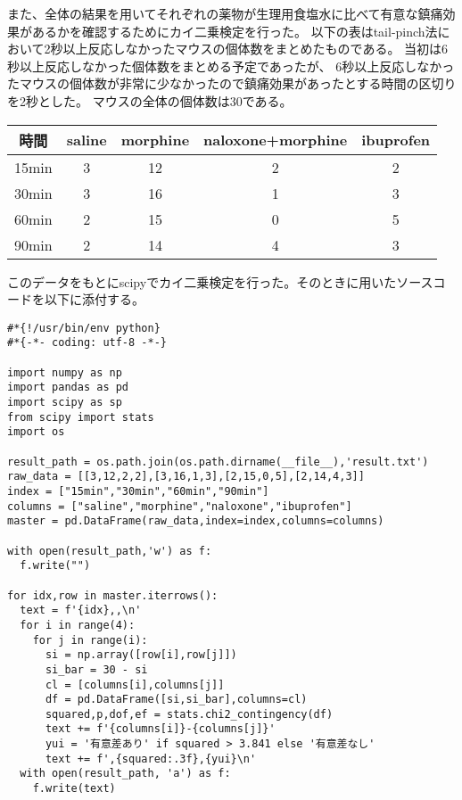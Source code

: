 \documentclass[a4paper,papersize,dvipdfmx]{jsarticle}
\begin{document}
また、全体の結果を用いてそれぞれの薬物が生理用食塩水に比べて有意な鎮痛効果があるかを確認するためにカイ二乗検定を行った。
以下の表はtail-pinch法において2秒以上反応しなかったマウスの個体数をまとめたものである。
当初は6秒以上反応しなかった個体数をまとめる予定であったが、
6秒以上反応しなかったマウスの個体数が非常に少なかったので鎮痛効果があったとする時間の区切りを2秒とした。
マウスの全体の個体数は30である。

\begin{table}[H]
\centering
\begin{tabular}{|c|c|c|c|c|}
\hline
時間    & saline & morphine & naloxone+morphine & ibuprofen \\ \hline
15min & 3      & 12       & 2                 & 2         \\ \hline
30min & 3      & 16       & 1                 & 3         \\ \hline
60min & 2      & 15       & 0                 & 5         \\ \hline
90min & 2      & 14       & 4                 & 3         \\ \hline
\end{tabular}
\end{table}

このデータをもとにscipyでカイ二乗検定を行った。そのときに用いたソースコードを以下に添付する。

\begin{lstlisting}[caption=chi\_sq.py]
#*{!/usr/bin/env python}
#*{-*- coding: utf-8 -*-}

import numpy as np
import pandas as pd
import scipy as sp
from scipy import stats
import os

result_path = os.path.join(os.path.dirname(__file__),'result.txt')
raw_data = [[3,12,2,2],[3,16,1,3],[2,15,0,5],[2,14,4,3]]
index = ["15min","30min","60min","90min"]
columns = ["saline","morphine","naloxone","ibuprofen"]
master = pd.DataFrame(raw_data,index=index,columns=columns)

with open(result_path,'w') as f:
  f.write("")

for idx,row in master.iterrows():
  text = f'{idx},,\n'
  for i in range(4):
    for j in range(i):
      si = np.array([row[i],row[j]])
      si_bar = 30 - si
      cl = [columns[i],columns[j]]
      df = pd.DataFrame([si,si_bar],columns=cl)
      squared,p,dof,ef = stats.chi2_contingency(df)
      text += f'{columns[i]}-{columns[j]}'
      yui = '有意差あり' if squared > 3.841 else '有意差なし'
      text += f',{squared:.3f},{yui}\n'
  with open(result_path, 'a') as f:
    f.write(text)
\end{lstlisting}
\end{document}
